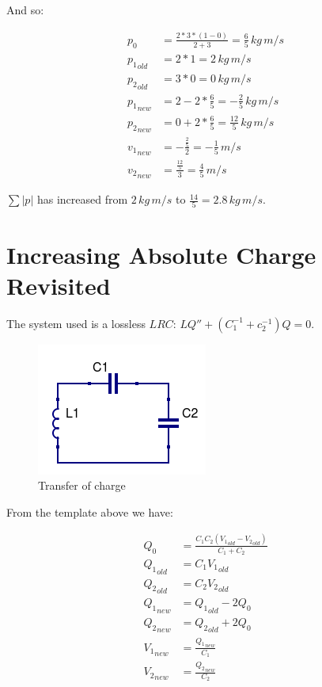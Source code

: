 \documentclass[]{../common/elementary-physics}
\begin{document}
And so:

\begin{subequations}
\begin{align}
p_0 &= \frac{2 * 3 * (1-0)}{2 + 3} = \frac{6}{5} \, kg \, m/s \\
{p_1}_{old} &= 2 * 1 = 2 \, kg \, m/s \\
{p_2}_{old} &= 3 * 0 = 0 \, kg \, m/s \\
{p_1}_{new} &= 2 -2 * \frac{6}{5} = -\frac{2}{5} \, kg \, m/s \\
{p_2}_{new} &= 0 +2 * \frac{6}{5} = \frac{12}{5} \, kg \, m/s \\
{v_1}_{new} &= -\frac{\frac{2}{5}}{2} = -\frac{1}{5} \, m/s \\
{v_2}_{new} &= \frac{\frac{12}{5}}{3} = \frac{4}{5} \, m/s
\end{align}
\end{subequations}

$\sum |p|$ has increased from $2 \, kg \, m/s$ to $\frac{14}{5} = 2.8 \, kg \, m/s$.

\section{Increasing Absolute Charge Revisited}

The system used is a lossless $LRC$\cite{ef3ch}: $L Q'' + (C_1^{-1} + c_2^{-1}) Q = 0$.

\begin{figure}[ht] \centering
	\includegraphics[scale=.5]{LCC} \caption{Transfer of charge}
\end{figure}

From the template above we have:

\begin{subequations}
\begin{align}
Q_0 &= \frac{C_1 C_2 ({V_1}_{old}-{V_2}_{old})}{C_1 + C_2} \\
{Q_1}_{old} &= C_1 {V_1}_{old} \\
{Q_2}_{old} &= C_2 {V_2}_{old} \\
{Q_1}_{new} &= {Q_1}_{old} -2 Q_0 \\
{Q_2}_{new} &= {Q_2}_{old} +2 Q_0 \\
{V_1}_{new} &= \frac{{Q_1}_{new}}{C_1} \\
{V_2}_{new} &= \frac{{Q_2}_{new}}{C_2}
\end{align}
\end{subequations}
\end{document}
